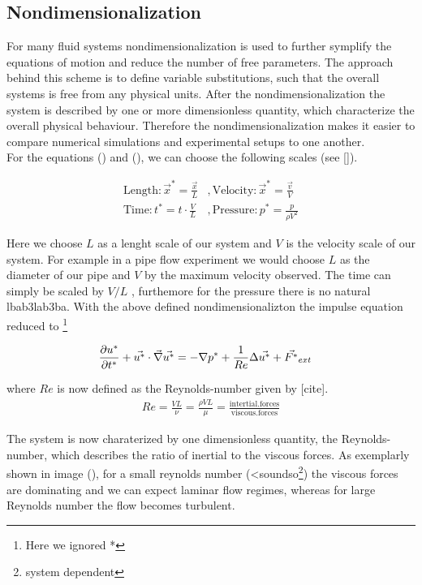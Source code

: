 \subsection{Nondimensionalization}

For many fluid systems nondimensionalization is used to further symplify the equations of motion and reduce the number of free parameters.
The approach behind this scheme is to define variable substitutions, such that the overall systems is free from any physical units.
After the nondimensionalization the system is described by one or more dimensionless quantity, which characterize the overall physical behaviour.
Therefore the nondimensionalization makes it easier to compare numerical simulations and experimental setups to one another.\\
For the equations () and (), we can choose the following scales (see []).

\begin{align}
    \mathrm{Length}  : \vec{x}^* = \frac{\vec{x}}{L}  &, \mathrm{Velocity}: \vec{x}^* = \frac{\vec{v}}{V}\\
    \mathrm{Time}    : t^* = t \cdot \frac{V}{L}      &, \mathrm{Pressure}: p^* = \frac{p}{\rho V^2}
\end{align}

Here we choose $L$ as a lenght scale of our system and $V$ is the velocity scale of our system.
For example in a pipe flow experiment we would choose $L$ as the diameter of our pipe and $V$ by the maximum velocity observed.
The time can simply be scaled  by $V/L$ , furthemore for the pressure there is no natural lbab3lab3ba.
With the above defined nondimensionalizton the impulse equation reduced to \footnote{Here we ignored *}

\begin{align}
    \pdn[u^*]{t^*} + \vec{u^*} \cdot \vec{\nabla} \vec{u^*} &= -\nabla p^* + \frac{1}{Re} \Delta \vec{u^*} + \vec{F^*}_{ext}
\end{align}

where $Re$ is now defined as the Reynolds-number given by [cite].
\begin{align}
    Re = \frac{VL}{\nu} = \frac{\rho VL}{\mu} = \frac{\mathrm{intertial.forces}}{\mathrm{viscous.forces}}
\end{align}

The system is now charaterized by one dimensionless quantity, the Reynolds-number, which describes the ratio of inertial to the viscous forces.
As exemplarly shown in image (),  for a small reynolds number (<soundso\footnote{system dependent})  the viscous forces are dominating and we can expect laminar flow regimes, whereas for
large Reynolds number the flow becomes turbulent.

